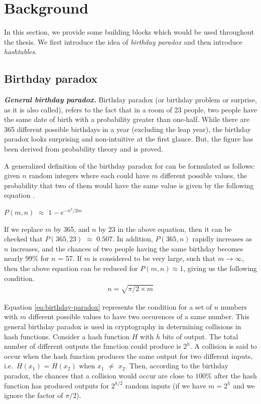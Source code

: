 \section{Background}

In this section, we provide some building blocks which would be used throughout the thesis. We first introduce the idea of \textit{birthday paradox} and then introduce \textit{hashtables}.

\subsection{Birthday paradox}
\label{sec:bday-paradox}

\indent \textit{\textbf{General birthday paradox.}} Birthday paradox (or birthday problem or surprise, as it is also called), refers to the fact that in a room of 23 people, two people have the same date of birth with a probability greater than one-half. While there are 365 different possible birthdays in a year (excluding the leap year), the birthday paradox looks surprising and non-intuitive at the first glance. But, the figure has been derived from probability theory and is proved. 

A generalized definition of the birthday paradox for can be formulated as follows: given $n$ random integers where each could have $m$ different possible values, the probability that two of them would have the same value is given by the following equation \cite{menezes}.
\begin{center}
$P(m,n)$ $\approx$ $1 - e^{-{n^2}/{2m}}$
\end{center}
If we replace $m$ by 365, and $n$ by 23 in the above equation, then it can be checked that $P(365,23)$ $\approx$ $0.507$. In addition, $P(365,n)$ rapidly increases as $n$ increases, and the chances of two people having the same birthday becomes nearly $99 \%$ for $n$ = 57. If $m$ is considered to be very large, such that $m \rightarrow \infty$, then the above equation can be reduced for $P(m,n) \approx 1$, giving us the following condition. 
\begin{align}
\label{eq:birthday-paradox} n = \sqrt{\pi/2 \times m}
\end{align}

Equation \ref{eq:birthday-paradox} represents the condition for a set of $n$ numbers with $m$ different possible values to have two occurences of a same number. This general birthday paradox is used in cryptography in determining collisions in hash functions. Consider a hash function $H$ with $h$ bits of output. The total number of different outputs the function could produce is $2^{h}$. A collision is said to occur when the hash function produces the same output for two different inputs, i.e.~$H(x_1)$ = $H(x_2)$ when $x_1$ $\neq$ $x_2$. Then, according to the birthday paradox, the chances that a collision would occur are close to $100 \%$ after the hash function has produced outputs for $2^{h/2}$ random inputs (if we have $m = 2^h$ and we ignore the factor of $\pi/2$).\\

